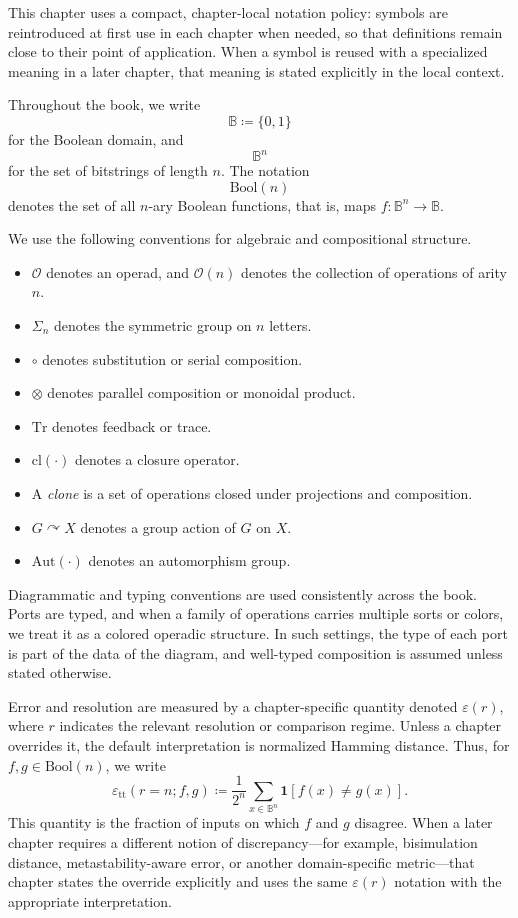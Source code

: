 This chapter uses a compact, chapter-local notation policy: symbols are reintroduced at first use in each chapter when needed, so that definitions remain close to their point of application. When a symbol is reused with a specialized meaning in a later chapter, that meaning is stated explicitly in the local context.

Throughout the book, we write
\[
\mathbb{B} \coloneqq \{0,1\}
\]
for the Boolean domain, and
\[
\mathbb{B}^n
\]
for the set of bitstrings of length $n$. The notation
\[
\mathrm{Bool}(n)
\]
denotes the set of all $n$-ary Boolean functions, that is, maps $f : \mathbb{B}^n \to \mathbb{B}$.

We use the following conventions for algebraic and compositional structure.
\begin{itemize}
  \item $\mathcal{O}$ denotes an operad, and $\mathcal{O}(n)$ denotes the collection of operations of arity $n$.
  \item $\Sigma_n$ denotes the symmetric group on $n$ letters.
  \item $\circ$ denotes substitution or serial composition.
  \item $\otimes$ denotes parallel composition or monoidal product.
  \item $\mathrm{Tr}$ denotes feedback or trace.
  \item $\mathrm{cl}(\cdot)$ denotes a closure operator.
  \item A \emph{clone} is a set of operations closed under projections and composition.
  \item $G \curvearrowright X$ denotes a group action of $G$ on $X$.
  \item $\mathrm{Aut}(\cdot)$ denotes an automorphism group.
\end{itemize}

Diagrammatic and typing conventions are used consistently across the book. Ports are typed, and when a family of operations carries multiple sorts or colors, we treat it as a colored operadic structure. In such settings, the type of each port is part of the data of the diagram, and well-typed composition is assumed unless stated otherwise.

Error and resolution are measured by a chapter-specific quantity denoted $\varepsilon(r)$, where $r$ indicates the relevant resolution or comparison regime. Unless a chapter overrides it, the default interpretation is normalized Hamming distance. Thus, for $f,g \in \mathrm{Bool}(n)$, we write
\[
\varepsilon_{\mathrm{tt}}(r=n; f,g)
\coloneqq \frac{1}{2^n} \sum_{x \in \mathbb{B}^n} \mathbf{1}[f(x) \neq g(x)].
\]
This quantity is the fraction of inputs on which $f$ and $g$ disagree. When a later chapter requires a different notion of discrepancy---for example, bisimulation distance, metastability-aware error, or another domain-specific metric---that chapter states the override explicitly and uses the same $\varepsilon(r)$ notation with the appropriate interpretation.

